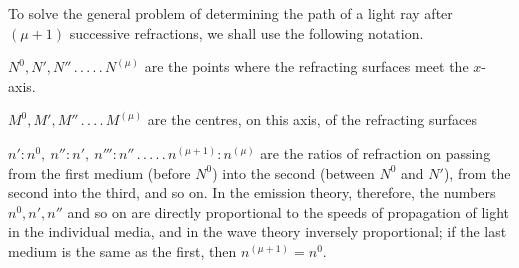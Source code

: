 To solve the general problem of determining the path of a light ray after $(\mu+1)$ successive refractions, we shall use the following notation.

$N^0,N',N''\, .\, .\, .\, .\, .\, N^{(\mu)}$ are the points where the refracting surfaces meet the $x$-axis.

$M^0,M',M''\, .\, .\, .\, .\, M^{(\mu)}$ are the centres, on this axis, of the refracting surfaces

$n':n^0,\ n'':n',\ n''':n''\, .\, .\, .\, .\, .\, n^{(\mu+1)}:n^{(\mu)}$ are the ratios of refraction on passing from the first medium (before $N^0$) into the second (between $N^0$ and $N'$), from the second into the third, and so on. In the emission theory, therefore, the numbers $n^0,n',n''$ and so on are directly proportional to the speeds of propagation of light in the individual media, and in the wave theory inversely proportional; if the last medium is the same as the first, then $n^{(\mu+1)}=n^0$.

